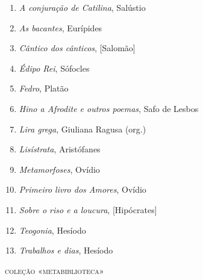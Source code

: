 \begin{enumerate}
\setlength{\topsep}{2pt}
\setlength{\partopsep}{0pt}
\setlength\parskip{4.2pt}
\setlength\itemsep{-1.4mm}
\item \textit{A conjuração de Catilina}, Salústio
\item \textit{As bacantes}, Eurípides
\item \textit{Cântico dos cânticos}, [Salomão]
\item \textit{Édipo Rei}, Sófocles
\item \textit{Fedro}, Platão
\item \textit{Hino a Afrodite e outros poemas}, Safo de Lesbos 
\item \textit{Lira grega}, Giuliana Ragusa (org.)
\item \textit{Lisístrata}, Aristófanes
\item \textit{Metamorfoses}, Ovídio
\item \textit{Primeiro livro dos Amores}, Ovídio
\item \textit{Sobre o riso e a loucura}, [Hipócrates]
\item \textit{Teogonia}, Hesíodo
\item \textit{Trabalhos e dias}, Hesíodo
\end{enumerate}


\medskip
{\large\textsc{coleção «metabiblioteca»}}



